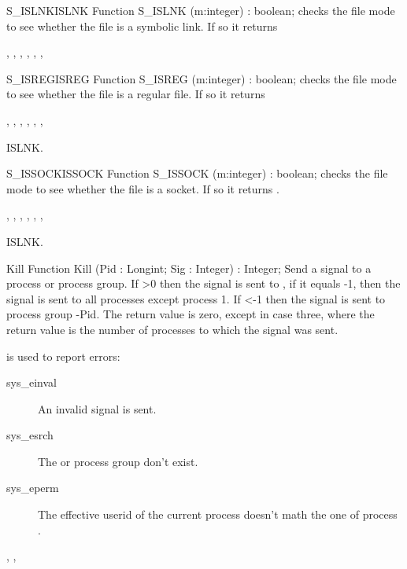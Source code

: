 \begin{functionl}{S\_ISLNK}{ISLNK}
\Declaration
Function S\_ISLNK (m:integer) : boolean;
\Description
  checks the file mode  to see whether the file is a
symbolic link. If so it returns 

\Errors
{},
 ,
 ,
 ,
 ,
 ,

\SeeAlso
\end{functionl}



\begin{functionl}{S\_ISREG}{ISREG}
\Declaration
Function S\_ISREG (m:integer) : boolean;
\Description
  checks the file mode  to see whether the file is a
regular file. If so it returns 

\Errors
{},
 , 
 ,
 ,
 ,
 ,

\SeeAlso
ISLNK.
\end{functionl}
\begin{functionl}{S\_ISSOCK}{ISSOCK}
\Declaration
Function S\_ISSOCK (m:integer) : boolean;
\Description
  checks the file mode  to see whether the file is a
socket. If so it returns .

\Errors
{},
 , 
 ,
 ,
 ,
 ,

\SeeAlso
ISLNK.
\end{functionl}

\begin{function}{Kill}
\Declaration
Function Kill (Pid : Longint; Sig : Integer) : Integer;
\Description
 Send a signal  to a process or process group. If >0 then
the signal is sent to , if it equals -1, then the signal is sent to
all processes except process 1. If <-1 then the signal is sent to
process group -Pid.
The return value is zero, except in case three, where the return value is the
number of processes to which the signal was sent.

\Errors
{} is used to report errors:
\begin{description}
\item[sys\_einval] An invalid signal is sent.
\item[sys\_esrch] The  or process group don't exist.
\item[sys\_eperm] The effective userid of the current process doesn't math
the one of process .
\end{description}

\SeeAlso
{}, ,  
\end{function}

